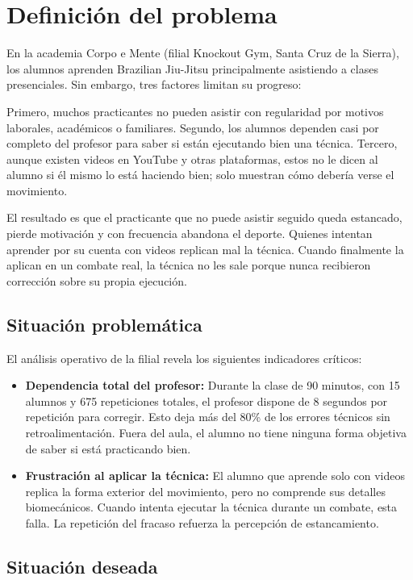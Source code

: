 \documentclass[12pt,letterpaper]{article}
\begin{document}
\section{Definición del problema}

En la academia Corpo e Mente (filial Knockout Gym, Santa Cruz de la Sierra), los alumnos aprenden Brazilian Jiu-Jitsu principalmente asistiendo a clases presenciales. Sin embargo, tres factores limitan su progreso:

Primero, muchos practicantes no pueden asistir con regularidad por motivos laborales, académicos o familiares. Segundo, los alumnos dependen casi por completo del profesor para saber si están ejecutando bien una técnica. Tercero, aunque existen videos en YouTube y otras plataformas, estos no le dicen al alumno si él mismo lo está haciendo bien; solo muestran cómo debería verse el movimiento.

El resultado es que el practicante que no puede asistir seguido queda estancado, pierde motivación y con frecuencia abandona el deporte. Quienes intentan aprender por su cuenta con videos replican mal la técnica. Cuando finalmente la aplican en un combate real, la técnica no les sale porque nunca recibieron corrección sobre su propia ejecución.

\subsection{Situación problemática}

El análisis operativo de la filial revela los siguientes indicadores críticos:
\begin{itemize}
    \item \textbf{Dependencia total del profesor:} Durante la clase de 90 minutos, con 15 alumnos y 675 repeticiones totales, el profesor dispone de 8 segundos por repetición para corregir. Esto deja más del 80\% de los errores técnicos sin retroalimentación. Fuera del aula, el alumno no tiene ninguna forma objetiva de saber si está practicando bien.
    \item \textbf{Frustración al aplicar la técnica:} El alumno que aprende solo con videos replica la forma exterior del movimiento, pero no comprende sus detalles biomecánicos. Cuando intenta ejecutar la técnica durante un combate, esta falla. La repetición del fracaso refuerza la percepción de estancamiento.
\end{itemize}

\subsection{Situación deseada}
\end{document}
